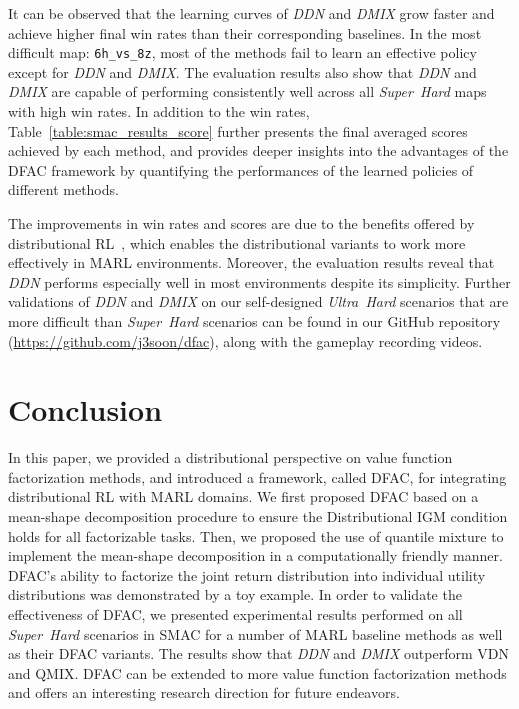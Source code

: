 \documentclass{article}
\newcommand{\superhard}{\textit{Super~Hard}}
\newcommand{\ultrahard}{\textit{Ultra~Hard}}
\newcommand{\ddn}{\textit{DDN}}
\newcommand{\dmix}{\textit{DMIX}}
\newcounter{example}
\begin{document}
It can be observed that the learning curves of \ddn{} and \dmix{} grow faster and achieve higher final win rates than their corresponding baselines. In the most difficult map: \texttt{6h\_vs\_8z}, most of the methods fail to learn an effective policy except for \ddn{} and \dmix{}. The evaluation results also show that \ddn{} and \dmix{} are capable of performing consistently well across all \superhard{} maps with high win rates. In addition to the win rates, Table~\ref{table:smac_results_score} further presents the final averaged scores achieved by each method, and provides deeper insights into the advantages of the DFAC framework by quantifying the performances of the learned policies of different methods.

The improvements in win rates and scores are due to the benefits offered by distributional RL~\cite{Lyle2019Comparative}, which enables the distributional variants to work more effectively in MARL environments. Moreover, the evaluation results reveal that \ddn{} performs especially well in most environments despite its simplicity. Further validations of \ddn{} and \dmix{} on our self-designed \ultrahard{} scenarios that are more difficult than \superhard{} scenarios can be found in our GitHub repository (\href{https://github.com/j3soon/dfac}{https://github.com/j3soon/dfac}), along with the gameplay recording videos. \section{Conclusion}
\label{sec:conclusion}

In this paper, we provided a distributional perspective on value function factorization methods, and introduced a framework, called DFAC, for integrating distributional RL with MARL domains. We first proposed  DFAC based on a mean-shape decomposition procedure to ensure the Distributional IGM condition holds for all factorizable tasks. Then, we proposed the use of quantile mixture to implement the mean-shape decomposition in a computationally friendly manner. DFAC's ability to factorize the joint return distribution into individual utility distributions was demonstrated by a toy example. In order to validate the effectiveness of DFAC, we presented experimental results performed on all \superhard{} scenarios in SMAC for a number of MARL baseline methods as well as their DFAC variants. The results show that \ddn{} and \dmix{} outperform VDN and QMIX. DFAC can be extended to more value function factorization methods and offers an interesting research direction for future endeavors.
\end{document}

